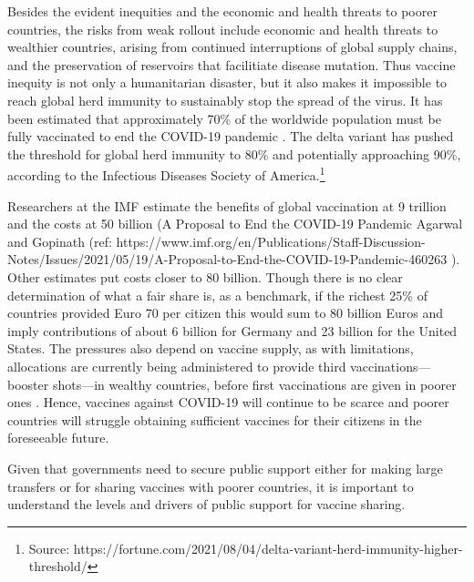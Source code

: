 \documentclass[12pt,oneside,smallheadings,chapterprefix=true]{article}
\begin{document}
Besides the evident inequities and the economic and health threats to poorer countries, the risks from weak rollout include economic and health threats to wealthier countries, arising from continued interruptions of global supply chains, and the preservation of reservoirs that facilitiate disease mutation. Thus vaccine inequity is not only a humanitarian disaster, but it also makes it impossible to reach global herd immunity to sustainably stop the spread of the virus. It has been estimated that  approximately 70\% of the worldwide population must be fully vaccinated to end the COVID-19 pandemic \citep{Randolph2020}. The delta variant has pushed the threshold for global herd immunity to  80\% and potentially approaching 90\%, according to the Infectious Diseases Society of America.\footnote{Source:  https://fortune.com/2021/08/04/delta-variant-herd-immunity-higher-threshold/} 

Researchers at the IMF estimate the benefits of global vaccination at 9 trillion and the costs at 50 billion (A Proposal to End the COVID-19 Pandemic
Agarwal and Gopinath (ref: 
https://www.imf.org/en/Publications/Staff-Discussion-Notes/Issues/2021/05/19/A-Proposal-to-End-the-COVID-19-Pandemic-460263 ). Other estimates put costs closer to 80 billion.  Though there is no clear determination of what a fair share is, as a benchmark, if the richest 25\% of countries provided Euro 70 per citizen this would sum to 80 billion Euros and imply contributions of about 6 billion for Germany and 23 billion for the United States.  The pressures also depend on vaccine supply, as with limitations, allocations are currently being administered to provide third vaccinations---booster shots---in wealthy countries, before first vaccinations are given in poorer ones \citep{Mahase2021}. Hence,  vaccines against COVID-19 will continue to be scarce  and poorer countries will struggle obtaining  sufficient vaccines for their citizens in the foreseeable future. 

Given that governments need to secure public support either for making large transfers or for sharing vaccines with poorer countries, it is important to understand the levels and drivers of public support for vaccine sharing. 
\end{document}
